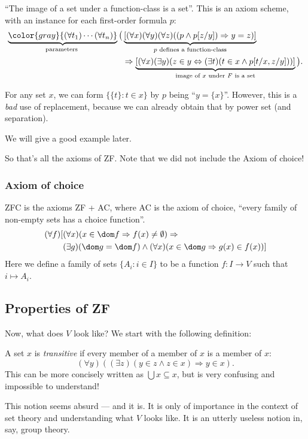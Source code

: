 \documentclass[a4paper]{article}
\begin{document}
\begin{axiom}
  ``The image of a set under a function-class is a set''. This is an axiom scheme, with an instance for each first-order formula $p$:
  \begin{align*}
   \underbrace{{\color{gray}{(\forall t_1)\cdots(\forall t_n)}}}_{\text{parameters }}\big(&\underbrace{[(\forall x)(\forall y)(\forall z)((p\wedge p[z/y])\Rightarrow y=z)]}_{p\text{ defines a function-class}}\\
   & \Rightarrow \underbrace{[(\forall x)(\exists y)(z\in y \Leftrightarrow (\exists t)(t\in x\wedge p[t/x, z/y]))]}_{\text{image of }x\text{ under }F\text{ is a set}}\big).
  \end{align*}
\end{axiom}

\begin{eg}
  For any set $x$, we can form $\{\{t\}: t\in x\}$ by $p$ being ``$y = \{x\}$''. However, this is a \emph{bad} use of replacement, because we can already obtain that by power set (and separation).

  We will give a good example later.
\end{eg}

So that's all the axioms of ZF. Note that we did not include the Axiom of choice!

\subsubsection*{Axiom of choice}
\begin{defi}[ZFC]
  ZFC is the axioms ZF + AC, where AC is the axiom of choice, ``every family of non-empty sets has a choice function''.
  \begin{align*}
    (\forall f)[&(\forall x)(x\in \dom f \Rightarrow f(x)\not= \emptyset) \Rightarrow \\
    &(\exists g)(\dom g = \dom f) \wedge (\forall x)(x\in \dom g \Rightarrow g(x) \in f(x))]
  \end{align*}
  Here we define a family of sets $\{A_i: i \in I\}$ to be a function $f: I \to V$ such that $i \mapsto A_i$.
\end{defi}

\subsection{Properties of ZF}
Now, what does $V$ look like? We start with the following definition:
\begin{defi}
  A set $x$ is \emph{transitive} if every member of a member of $x$ is a member of $x$:
  \[
    (\forall y)((\exists z)(y\in z\wedge z\in x)\Rightarrow y \in x).
  \]
  This can be more concisely written as $\bigcup x \subseteq x$, but is very confusing and impossible to understand!
\end{defi}
This notion seems absurd --- and it is. It is only of importance in the context of set theory and understanding what $V$ looks like. It is an utterly useless notion in, say, group theory.
\end{document}
